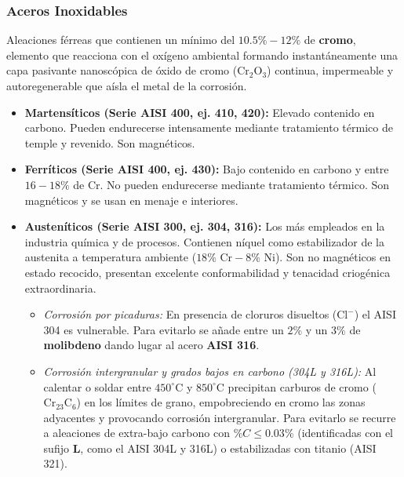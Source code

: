 \subsubsection{Aceros Inoxidables}
Aleaciones férreas que contienen un mínimo del $10.5\% - 12\%$ de \textbf{cromo}, elemento que reacciona con el oxígeno ambiental formando instantáneamente una capa pasivante nanoscópica de óxido de cromo ($\text{Cr}_2\text{O}_3$) continua, impermeable y autoregenerable que aísla el metal de la corrosión.
\begin{itemize}
    \item \textbf{Martensíticos (Serie AISI 400, ej. 410, 420):} Elevado contenido en carbono. Pueden endurecerse intensamente mediante tratamiento térmico de temple y revenido. Son magnéticos.
    \item \textbf{Ferríticos (Serie AISI 400, ej. 430):} Bajo contenido en carbono y entre $16-18\%$ de Cr. No pueden endurecerse mediante tratamiento térmico. Son magnéticos y se usan en menaje e interiores.
    \item \textbf{Austeníticos (Serie AISI 300, ej. 304, 316):} Los más empleados en la industria química y de procesos. Contienen níquel como estabilizador de la austenita a temperatura ambiente ($18\%\text{ Cr} - 8\%\text{ Ni}$). Son no magnéticos en estado recocido, presentan excelente conformabilidad y tenacidad criogénica extraordinaria.
          \begin{itemize}
              \item \textit{Corrosión por picaduras:} En presencia de cloruros disueltos ($\text{Cl}^-$) el AISI 304 es vulnerable. Para evitarlo se añade entre un $2\%$ y un $3\%$ de \textbf{molibdeno} dando lugar al acero \textbf{AISI 316}.
              \item \textit{Corrosión intergranular y grados bajos en carbono (304L y 316L):} Al calentar o soldar entre $450^\circ\text{C}$ y $850^\circ\text{C}$ precipitan carburos de cromo ($\text{Cr}_{23}\text{C}_6$) en los límites de grano, empobreciendo en cromo las zonas adyacentes y provocando corrosión intergranular. Para evitarlo se recurre a aleaciones de extra-bajo carbono con $\%C \leqslant 0.03\%$ (identificadas con el sufijo \textbf{L}, como el AISI 304L y 316L) o estabilizadas con titanio (AISI 321).
          \end{itemize}
\end{itemize}
